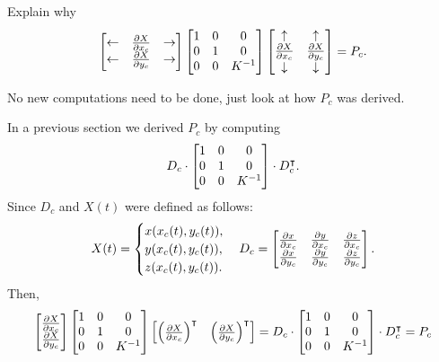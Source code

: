 \documentclass[newpage,hints,handout]{ximera}
\begin{document}
\begin{problem}
  Explain why
  \[
\begin{bmatrix}
    \leftarrow & \pp[X]{x_c} & \rightarrow \\
    \leftarrow & \pp[X]{y_c} & \rightarrow
  \end{bmatrix}
  \begin{bmatrix}
    1 & 0 & 0\\
    0 & 1 & 0\\
    0 & 0 & K^{-1}
  \end{bmatrix}
  \begin{bmatrix}
    \uparrow & \uparrow \\
    \pp[X]{x_c} & \pp[X]{y_c} \\
    \downarrow & \downarrow
  \end{bmatrix} =P_c.
  \]
  \begin{hint}
    No new computations need to be done, just look at how $P_c$ was derived.
  \end{hint}
  \begin{freeResponse}
  In a previous section we derived $P_c$ by computing
  \[
  D_c \cdot 
  \begin{bmatrix}
    1 & 0 & 0\\
    0 & 1 & 0\\
    0 & 0 & K^{-1}
  \end{bmatrix} \cdot D_c^\transpose.
  \]
  Since $D_c$ and $X\left(t\right)$ were defined as follows:
  \[
X(t) = 
\begin{cases}
  x(x_c(t),y_c(t)),\\
  y(x_c(t),y_c(t)),\\
  z(x_c(t),y_c(t)).
\end{cases} \\
 D_c =
  \begin{bmatrix}
    \pp[x]{x_c} & \pp[y]{x_c} & \pp[z]{x_c} \\
    \pp[x]{y_c}   & \pp[y]{y_c}   & \pp[z]{y_c}
  \end{bmatrix}.
\]
Then, 
\[
 \begin{bmatrix}
    \pp[X]{x_c}\\
    \pp[X]{y_c}
  \end{bmatrix}
  \begin{bmatrix}
    1 & 0 & 0\\
    0 & 1 & 0\\
    0 & 0 & K^{-1}
  \end{bmatrix}
  \begin{bmatrix}
    \left(\pp[X]{x_c}\right)^\transpose & \left(\pp[X]{y_c}\right)^\transpose
  \end{bmatrix}
  = D_c \cdot 
  \begin{bmatrix}
    1 & 0 & 0\\
    0 & 1 & 0\\
    0 & 0 & K^{-1}
  \end{bmatrix} \cdot D_c^\transpose
  = P_c
\]
  \end{freeResponse}
\end{problem}
\end{document}
